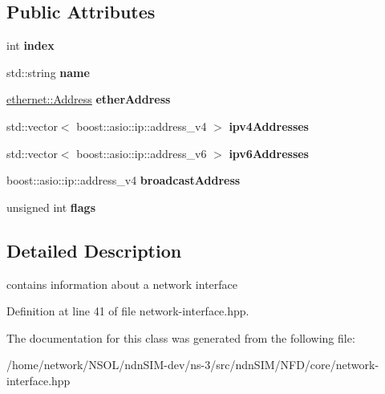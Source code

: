 \subsection*{Public Attributes}
\begin{DoxyCompactItemize}
\item 
int {\bfseries index}\hypertarget{classnfd_1_1NetworkInterfaceInfo_a629bec11212ad03e778e17142e5177cf}{}\label{classnfd_1_1NetworkInterfaceInfo_a629bec11212ad03e778e17142e5177cf}

\item 
std\+::string {\bfseries name}\hypertarget{classnfd_1_1NetworkInterfaceInfo_a12135f1cfb58203c68a6ab68a2fd09b9}{}\label{classnfd_1_1NetworkInterfaceInfo_a12135f1cfb58203c68a6ab68a2fd09b9}

\item 
\hyperlink{classndn_1_1util_1_1ethernet_1_1Address}{ethernet\+::\+Address} {\bfseries ether\+Address}\hypertarget{classnfd_1_1NetworkInterfaceInfo_a4f811496fe3fa105c505196efb4f7e39}{}\label{classnfd_1_1NetworkInterfaceInfo_a4f811496fe3fa105c505196efb4f7e39}

\item 
std\+::vector$<$ boost\+::asio\+::ip\+::address\+\_\+v4 $>$ {\bfseries ipv4\+Addresses}\hypertarget{classnfd_1_1NetworkInterfaceInfo_a3c9073af5be0dbdf5263b88fa320464a}{}\label{classnfd_1_1NetworkInterfaceInfo_a3c9073af5be0dbdf5263b88fa320464a}

\item 
std\+::vector$<$ boost\+::asio\+::ip\+::address\+\_\+v6 $>$ {\bfseries ipv6\+Addresses}\hypertarget{classnfd_1_1NetworkInterfaceInfo_aab9434e901396ce8aba647047be4b7a9}{}\label{classnfd_1_1NetworkInterfaceInfo_aab9434e901396ce8aba647047be4b7a9}

\item 
boost\+::asio\+::ip\+::address\+\_\+v4 {\bfseries broadcast\+Address}\hypertarget{classnfd_1_1NetworkInterfaceInfo_a1d71b6953f3368cf6ce5f734b4a7ef48}{}\label{classnfd_1_1NetworkInterfaceInfo_a1d71b6953f3368cf6ce5f734b4a7ef48}

\item 
unsigned int {\bfseries flags}\hypertarget{classnfd_1_1NetworkInterfaceInfo_a4f2facbe8bdc53620e9785c60f7c5f53}{}\label{classnfd_1_1NetworkInterfaceInfo_a4f2facbe8bdc53620e9785c60f7c5f53}

\end{DoxyCompactItemize}


\subsection{Detailed Description}
contains information about a network interface 

Definition at line 41 of file network-\/interface.\+hpp.



The documentation for this class was generated from the following file\+:\begin{DoxyCompactItemize}
\item 
/home/network/\+N\+S\+O\+L/ndn\+S\+I\+M-\/dev/ns-\/3/src/ndn\+S\+I\+M/\+N\+F\+D/core/network-\/interface.\+hpp\end{DoxyCompactItemize}
